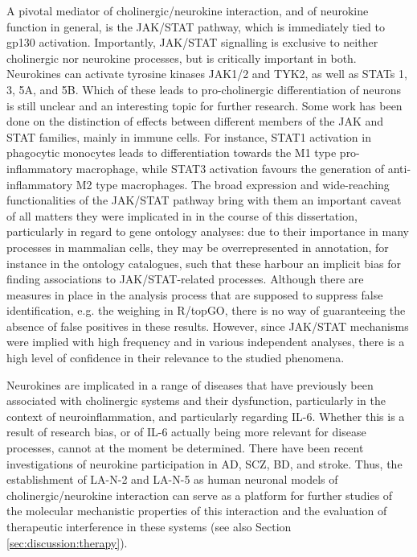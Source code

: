 A pivotal mediator of cholinergic/neurokine interaction, and of neurokine function in general, is the JAK/STAT pathway, which is immediately tied to gp130 activation. Importantly, JAK/STAT signalling is exclusive to neither cholinergic nor neurokine processes, but is critically important in both. Neurokines can activate tyrosine kinases JAK1/2 and TYK2, as well as STATs 1, 3, 5A, and 5B.\cite{Rawlings2004} Which of these leads to pro-cholinergic differentiation of neurons is still unclear and an interesting topic for further research.  Some work has been done on the distinction of effects between different members of the JAK and STAT families, mainly in immune cells. For instance, STAT1 activation in phagocytic monocytes leads to differentiation towards the M1 type pro-inflammatory macrophage, while STAT3 activation favours the generation of anti-inflammatory M2 type macrophages.\cite{Wang2014} The broad expression and wide-reaching functionalities of the JAK/STAT pathway bring with them an important caveat of all matters they were implicated in in the course of this dissertation, particularly in regard to gene ontology analyses: due to their importance in many processes in mammalian cells, they may be overrepresented in annotation, for instance in the ontology catalogues, such that these harbour an implicit bias for finding associations to JAK/STAT-related processes. Although there are measures in place in the analysis process that are supposed to suppress false identification, e.g. the weighing in R/topGO, there is no way of guaranteeing the absence of false positives in these results. However, since JAK/STAT mechanisms were implied with high frequency and in various independent analyses, there is a high level of confidence in their relevance to the studied phenomena.    

Neurokines are implicated in a range of diseases that have previously been associated with cholinergic systems and their dysfunction, particularly in the context of neuroinflammation, and particularly regarding IL-6. Whether this is a result of research bias, or of IL-6 actually being more relevant for disease processes, cannot at the moment be determined. There have been recent investigations of neurokine participation in AD,\cite{Pasquin2015,Baazaoui2018} SCZ,\cite{Chase2016,Girgis2018} BD,\cite{Goldsmith2016,Lu2019,Wiener2019} and stroke.\cite{Kang2012,Kang2013,Bustamante2014,Armstead2019} Thus, the establishment of LA-N-2 and LA-N-5 as human neuronal models of cholinergic/neurokine interaction can serve as a platform for further studies of the molecular mechanistic properties of this interaction and the evaluation of therapeutic interference in these systems (see also Section \ref{sec:discussion:therapy}).
 

